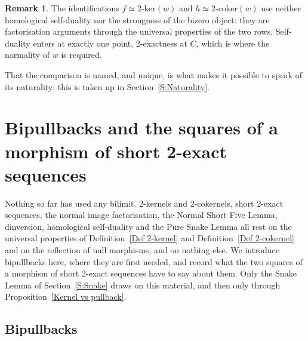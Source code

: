 \documentclass[reqno,a4paper]{amsart}
\numberwithin{equation}{section}
\theoremstyle{plain}
\theoremstyle{definition}
\newtheorem{remark}[subsection]{Remark}
\def\nameit#1{\textrm{#1}~}
\def\prox{\nameit{Proposition}}
\def\defx{\nameit{Definition}}
\renewcommand{\1}{\onecat{1}}
\newcommand{\twoker}{\ensuremath{2\text{-}\mathrm{ker}}}
\newcommand{\twocoker}{\ensuremath{2\text{-}\mathrm{coker}}}
\begin{document}
\begin{remark}\label{Rem Pure Snake Cost}
	The identifications \(f\simeq\twoker(w)\) and \(h\simeq\twocoker(w)\) use neither homological self-duality nor the strongness of the bizero object: they are factorisation arguments through the universal properties of the two rows. Self-duality enters at exactly one point, 2-exactness at \(C\), which is where the normality of \(w\) is required.
\end{remark}

That the comparison is named, and unique, is what makes it possible to speak of its naturality; this is taken up in Section~\ref{S:Naturality}.


\section{Bipullbacks and the squares of a morphism of short 2-exact sequences}\label{S:Bipullbacks}

Nothing so far has used any bilimit. 2-kernels and 2-cokernels, short 2-exact sequences, the normal image factorisation, the Normal Short Five Lemma, dinversion, homological self-duality and the Pure Snake Lemma all rest on the universal properties of \defx\ref{Def 2-kernel} and \defx\ref{Def 2-cokernel} and on the reflection of null morphisms, and on nothing else. We introduce bipullbacks here, where they are first needed, and record what the two squares of a morphism of short 2-exact sequences have to say about them. Only the Snake Lemma of Section~\ref{S:Snake} draws on this material, and then only through \prox\ref{Kernel vs pullback}.

\subsection{Bipullbacks}\label{SS:Bipullback}
\end{document}
